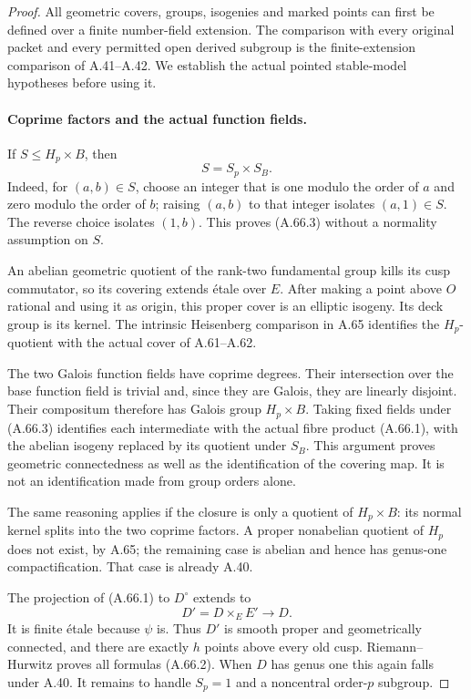 \begin{proof}
All geometric covers, groups, isogenies and marked points can
first be defined over a finite number-field extension. The
comparison with every original packet and every permitted open
derived subgroup is the finite-extension comparison of
A.41--A.42. We establish the actual pointed stable-model
hypotheses before using it.

\paragraph{Coprime factors and the actual function fields.}
If \(S\le H_p\times B\), then
\[
                         S=S_p\times S_B.
                                                               \tag{A.66.3}
\]
Indeed, for \((a,b)\in S\), choose an integer that is one
modulo the order of \(a\) and zero modulo the order of \(b\);
raising \((a,b)\) to that integer isolates \((a,1)\in S\).
The reverse choice isolates \((1,b)\). This proves (A.66.3)
without a normality assumption on \(S\).

An abelian geometric quotient of the rank-two fundamental
group kills its cusp commutator, so its covering extends
étale over \(E\). After making a point above \(O\) rational
and using it as origin, this proper cover is an elliptic
isogeny. Its deck group is its kernel. The intrinsic
Heisenberg comparison in A.65 identifies the \(H_p\)-quotient
with the actual cover of A.61--A.62.

The two Galois function fields have coprime degrees. Their
intersection over the base function field is trivial and,
since they are Galois, they are linearly disjoint. Their
compositum therefore has Galois group \(H_p\times B\).
Taking fixed fields under (A.66.3) identifies each intermediate
with the actual fibre product (A.66.1), with the abelian
isogeny replaced by its quotient under \(S_B\).
This argument proves geometric connectedness as well as the
identification of the covering map. It is not an identification
made from group orders alone.

The same reasoning applies if the closure is only a quotient
of \(H_p\times B\): its normal kernel splits into the two
coprime factors. A proper nonabelian quotient of \(H_p\) does
not exist, by A.65; the remaining case is abelian and hence
has genus-one compactification. That case is already A.40.

The projection of (A.66.1) to \(D^\circ\) extends to
\[
                         D'=D\times_E E'\longrightarrow D.
                                                               \tag{A.66.4}
\]
It is finite étale because \(\psi\) is. Thus \(D'\) is smooth
proper and geometrically connected, and there are exactly
\(h\) points above every old cusp. Riemann--Hurwitz proves
all formulas (A.66.2). When \(D\) has genus one this again
falls under A.40. It remains to handle \(S_p=1\) and a
noncentral order-\(p\) subgroup.


\end{proof}
